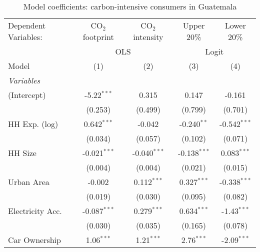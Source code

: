 
\begin{table}[htbp!]
   \centering
   \small
   \begin{adjustbox}{width = 1\textwidth, max height = 0.95\textheight, center}
      \begin{threeparttable}[b]
         \caption{\label{tab:Logit_1_GTM} Model coefficients: carbon-intensive consumers in Guatemala}
         \begin{tabular}{lcccc}
            \tabularnewline \midrule \midrule
            Dependent Variables: & CO$_{2}$ footprint & CO$_{2}$ intensity & Upper 20\%     & Lower 20\%\\   
             & \multicolumn{2}{c}{OLS} & \multicolumn{2}{c}{Logit} \\ 
            Model                & (1)                & (2)                & (3)            & (4)\\  
            \midrule
            \emph{Variables}\\
            (Intercept)          & -5.22$^{***}$      & 0.315              & 0.147          & -0.161\\   
                                 & (0.253)            & (0.499)            & (0.799)        & (0.701)\\   
            HH Exp. (log)        & 0.642$^{***}$      & -0.042             & -0.240$^{**}$  & -0.542$^{***}$\\   
                                 & (0.034)            & (0.057)            & (0.102)        & (0.071)\\   
            HH Size              & -0.021$^{***}$     & -0.040$^{***}$     & -0.138$^{***}$ & 0.083$^{***}$\\   
                                 & (0.004)            & (0.004)            & (0.021)        & (0.015)\\   
            Urban Area           & -0.002             & 0.112$^{***}$      & 0.327$^{***}$  & -0.338$^{***}$\\   
                                 & (0.019)            & (0.030)            & (0.095)        & (0.082)\\   
            Electricity Acc.     & -0.087$^{***}$     & 0.279$^{***}$      & 0.634$^{***}$  & -1.43$^{***}$\\   
                                 & (0.030)            & (0.035)            & (0.165)        & (0.078)\\   
            Car Ownership        & 1.06$^{***}$       & 1.21$^{***}$       & 2.76$^{***}$   & -2.09$^{***}$\\   

\end{tabular}
\end{threeparttable}
\end{adjustbox}
\end{table}
